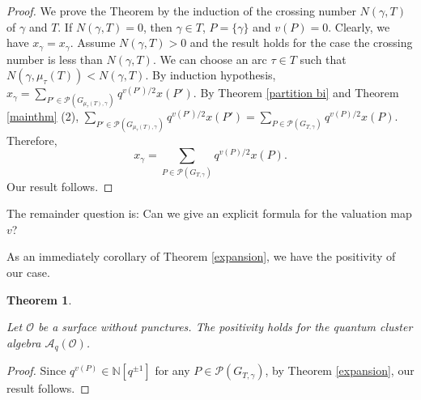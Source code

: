 \documentclass[10pt]{amsart}
\theoremstyle{theorems}
\newtheorem{Theorem}{Theorem}[section]
\begin{document}
\begin{proof}

We prove the Theorem by the induction of the crossing number $N(\gamma,T)$ of $\gamma$ and $T$. If $N(\gamma,T)=0$, then $\gamma\in T$, $P=\{\gamma\}$ and $v(P)=0$. Clearly, we have $x_{\gamma}=x_{\gamma}$. Assume $N(\gamma,T)>0$ and the result holds for the case the crossing number is less than $N(\gamma,T)$. We can choose an arc $\tau\in T$ such that $N(\gamma,\mu_{\tau}(T))<N(\gamma, T)$. By induction hypothesis, $x_{\gamma}=\sum_{P'\in \mathcal P(G_{\mu_{\tau}(T),\gamma})} q^{v(P')/2}x(P').$ By Theorem \ref{partition bi} and Theorem \ref{mainthm} (2), $\sum_{P'\in \mathcal P(G_{\mu_{\tau}(T),\gamma})} q^{v(P')/2}x(P')=\sum_{P\in \mathcal P(G_{T,\gamma})} q^{v(P)/2}x(P).$ Therefore, $$x_{\gamma}=\textstyle\sum_{P\in \mathcal P(G_{T,\gamma})} q^{v(P)/2}x(P).$$ Our result follows.
\end{proof}

\medskip

The remainder question is: Can we give an explicit formula for the valuation map $v$?

\medskip

As an immediately corollary of Theorem \ref{expansion}, we have the positivity of our case.

\medskip

\begin{Theorem}\label{positive}

Let $\mathcal O$ be a surface without punctures. The positivity holds for the quantum cluster algebra $\mathcal A_q(\mathcal O)$.

\end{Theorem}

\begin{proof}

Since $q^{v(P)}\in \mathbb N[q^{\pm 1}]$ for any $P\in \mathcal P(G_{T,\gamma})$, by Theorem \ref{expansion}, our result follows.
\end{proof}

\medskip
\end{document}
